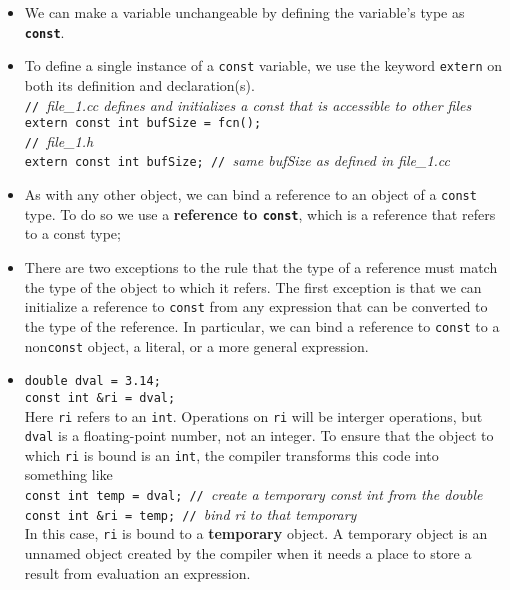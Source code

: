 \begin{itemize}
\item We can make a variable unchangeable by defining the variable's type as \textbf{\texttt{const}}.

\item To define a single instance of a \texttt{const} variable, we use the keyword \texttt{extern} on both its definition and declaration(s).\\\hspace*{1em}\texttt{// }\textit{file\_1.cc defines and initializes a const that is accessible to other files}\\\hspace*{1em}\texttt{extern const int bufSize = fcn();}\\\hspace*{1em}\texttt{// }\textit{file\_1.h}\\\hspace*{1em}\texttt{extern const int bufSize; // }\textit{same bufSize as defined in file\_1.cc}

\item As with any other object, we can bind a reference to an object of a \texttt{const} type. To do so we use a \textbf{reference to \texttt{const}}, which is a reference that refers to a const type;

\item There are two exceptions to the rule that the type of a reference must match the type of the object to which it refers. The first exception is that we can initialize a reference to \texttt{const} from any expression that can be converted to the type of the reference. In particular, we can bind a reference to \texttt{const} to a non\texttt{const} object, a literal, or a more general expression.


\item \hspace*{1em}\texttt{double dval = 3.14;}\\\hspace*{1em}\texttt{const int \&ri = dval;}\\Here \texttt{ri} refers to an \texttt{int}. Operations on \texttt{ri} will be interger operations, but \texttt{dval} is a floating-point number, not an integer. To ensure that the object to which \texttt{ri} is bound is an \texttt{int}, the compiler transforms this code into something like\\\hspace*{1em}\texttt{const int temp = dval; // }\textit{create a temporary const int from the double}\\\hspace*{1em}\texttt{const int \&ri = temp; // }\textit{bind ri to that temporary}\\In this case, \texttt{ri} is bound to a \textbf{temporary} object. A temporary object is an unnamed object created by the compiler when it needs a place to store a result from evaluation an expression.


\end{itemize}
